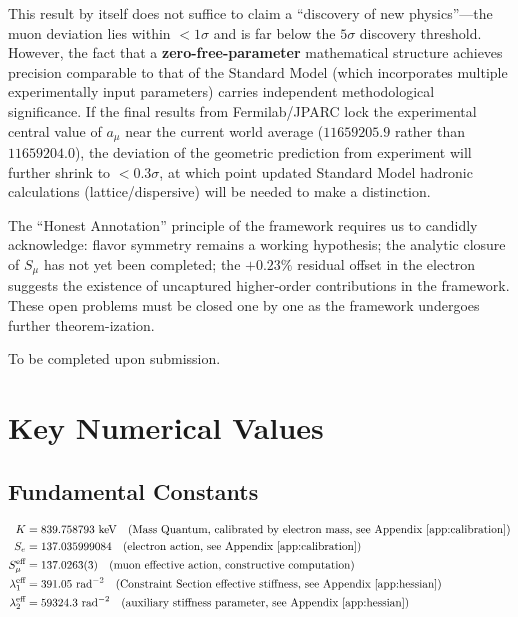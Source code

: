 \documentclass[aps,prd,reprint,nofootinbib]{revtex4-2}
\begin{document}
This result by itself does not suffice to claim a ``discovery of new physics''---the muon deviation lies within $< 1\sigma$ and is far below the $5\sigma$ discovery threshold. However, the fact that a \textbf{zero-free-parameter} mathematical structure achieves precision comparable to that of the Standard Model (which incorporates multiple experimentally input parameters) carries independent methodological significance. If the final results from Fermilab/JPARC lock the experimental central value of $a_\mu$ near the current world average ($11659205.9$ rather than $11659204.0$), the deviation of the geometric prediction from experiment will further shrink to $< 0.3\sigma$, at which point updated Standard Model hadronic calculations (lattice/dispersive) will be needed to make a distinction.

The ``Honest Annotation'' principle of the framework requires us to candidly acknowledge: flavor symmetry remains a working hypothesis; the analytic closure of $S_\mu$ has not yet been completed; the $+0.23\%$ residual offset in the electron suggests the existence of uncaptured higher-order contributions in the framework. These open problems must be closed one by one as the framework undergoes further theorem-ization.

\begin{acknowledgments}
To be completed upon submission.
\end{acknowledgments}

\appendix

\section{Key Numerical Values}
\label{app:constants}

\subsection{Fundamental Constants}
\begin{align}
K &= 839.758793 \text{ keV} \quad (\text{Mass Quantum, calibrated by electron mass, see Appendix~\ref{app:calibration}}) \\
S_e &= 137.035999084 \quad (\text{electron action, see Appendix~\ref{app:calibration}}) \\
S_\mu^{\text{eff}} &= 137.0263(3) \quad (\text{muon effective action, constructive computation}) \\
\lambda_1^{\text{eff}} &= 391.05 \text{ rad}^{-2} \quad (\text{Constraint Section effective stiffness, see Appendix~\ref{app:hessian}}) \\
\lambda_2^{\text{eff}} &= 59324.3 \text{ rad}^{-2} \quad (\text{auxiliary stiffness parameter, see Appendix~\ref{app:hessian}})
\end{align}
\end{document}
